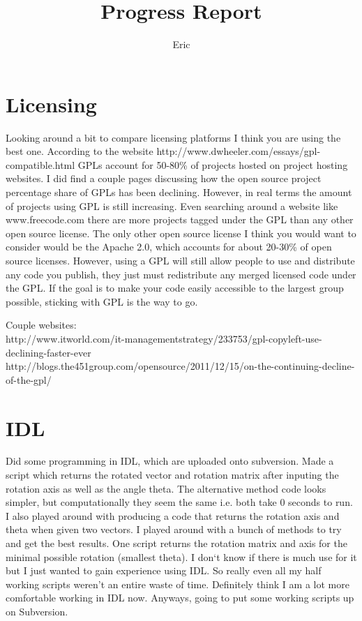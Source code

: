 \documentclass[11pt]{article}
\title{Progress Report}
\author{Eric}
\begin{document}
\maketitle
\medskip
\section{Licensing}
\hspace{0.5cm}Looking around a bit to compare licensing platforms I think you are using the best one. According to the website http://www.dwheeler.com/essays/gpl-compatible.html GPLs account for 50-80\% of projects hosted on project hosting websites. I did find a couple pages discussing how the open source project percentage share of GPLs has been declining. However, in real terms the amount of projects using GPL is still increasing. Even searching around a website like www.freecode.com there are more projects tagged under the GPL than any other open source license.  The only other open source license I think you would want to consider would be the Apache 2.0, which accounts for about 20-30\%  of open source licenses. However, using a GPL will still allow people to use and distribute any code you publish, they just must redistribute any merged licensed code under the GPL. If the goal is to make your code easily accessible to the largest group possible, sticking with GPL is the way to go.

Couple websites:\\
http://www.itworld.com/it-managementstrategy/233753/gpl-copyleft-use-declining-faster-ever \\
http://blogs.the451group.com/opensource/2011/12/15/on-the-continuing-decline-of-the-gpl/

\section{IDL}

Did some programming in IDL, which are uploaded onto subversion. Made a script which returns the rotated vector and rotation matrix after inputing the rotation axis as well as the angle theta. The alternative method code looks simpler, but computationally they seem the same i.e. both take 0 seconds to run. I also played around with producing a code that returns the rotation axis and theta when given two vectors. I played around with a bunch of methods to try and get the best results. One script returns the rotation matrix and axis for the minimal possible rotation (smallest theta). I don`t know if there is much use for it but I just wanted to gain experience using IDL. So really even all my half working scripts weren't an entire waste of time. Definitely think I am a lot more comfortable working in IDL now. Anyways, going to put some working scripts up on Subversion.
\end{document}
